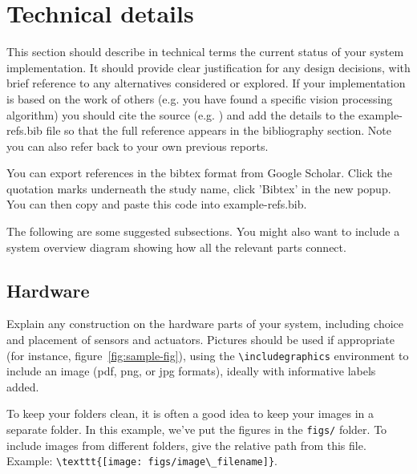 \documentclass{article}
\begin{document}


\section{Technical details}

This section should describe in technical terms the current status of your system implementation. It should provide clear justification for any design decisions, with brief reference to any alternatives considered or explored. If your implementation is based on the work of others (e.g. you have found a specific vision processing algorithm) you should cite the source (e.g. \cite{Newell81}) and add the details to the example-refs.bib file so that the full reference appears in the bibliography section. Note you can also refer back to your own previous reports. 

You can export references in the bibtex format from Google Scholar. Click the quotation marks underneath the study name, click 'Bibtex' in the new popup. You can then copy and paste this code into example-refs.bib.

The following are some suggested subsections. You might also want to include a system overview diagram showing how all the relevant parts connect. 

\subsection{Hardware}

Explain any construction on the hardware parts of your system, including choice and placement of sensors and actuators. Pictures should be used if appropriate (for instance, figure~\ref{fig:sample-fig}), using the \verb+\includegraphics+ environment to include an image (pdf, png, or jpg formats), ideally with informative labels added. 

To keep your folders clean, it is often a good idea to keep your images in a separate folder. In this example, we've put the figures in the \texttt{figs/} folder. To include images from different folders, give the relative path from this file. Example: \verb+\texttt{[image: figs/image\_filename]}+.

\end{document}
